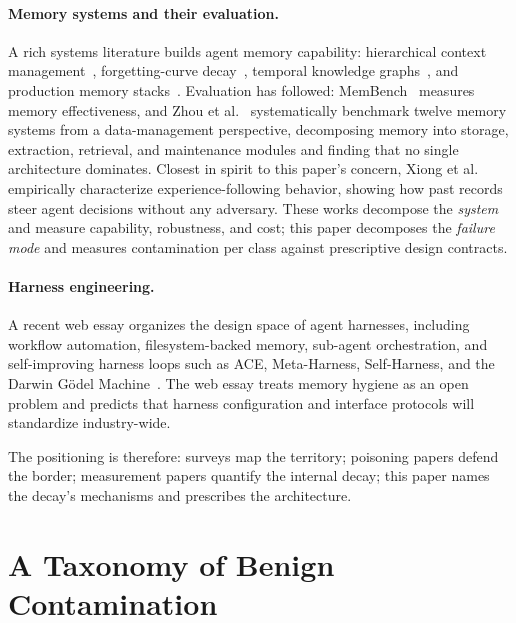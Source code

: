\documentclass[11pt]{article}
\begin{document}
\paragraph{Memory systems and their evaluation.}
A rich systems literature builds agent memory capability: hierarchical
context management~\cite{packer2023memgpt}, forgetting-curve
decay~\cite{zhong2024memorybank}, temporal knowledge
graphs~\cite{rasmussen2025zep}, and production memory
stacks~\cite{chhikara2025mem0, xu2025amem}. Evaluation has followed:
MemBench~\cite{tan2025membench} measures memory effectiveness, and Zhou et
al.~\cite{zhou2026agentnative} systematically benchmark twelve memory
systems from a data-management perspective, decomposing memory into
storage, extraction, retrieval, and maintenance modules and finding that no
single architecture dominates. Closest in spirit to this paper's concern,
Xiong et al.~\cite{xiong2025experiencefollowing} empirically characterize
experience-following behavior, showing how past records steer agent
decisions without any adversary. These works decompose the \emph{system}
and measure capability, robustness, and cost; this paper decomposes the
\emph{failure mode} and measures contamination per class against
prescriptive design contracts.

\paragraph{Harness engineering.}
A recent web essay organizes the design space of agent harnesses, including workflow
automation, filesystem-backed memory, sub-agent orchestration, and
self-improving harness loops such as ACE, Meta-Harness, Self-Harness, and
the Darwin G\"odel Machine~\cite{weng2026harness, zhang2025dgm}. The web essay
treats memory hygiene as an open problem and predicts that harness
configuration and interface protocols will standardize industry-wide.

The positioning is therefore: surveys map the territory; poisoning papers
defend the border; measurement papers quantify the internal decay; this
paper names the decay's mechanisms and prescribes the architecture.

\section{A Taxonomy of Benign Contamination}
\label{sec:taxonomy}
\end{document}
